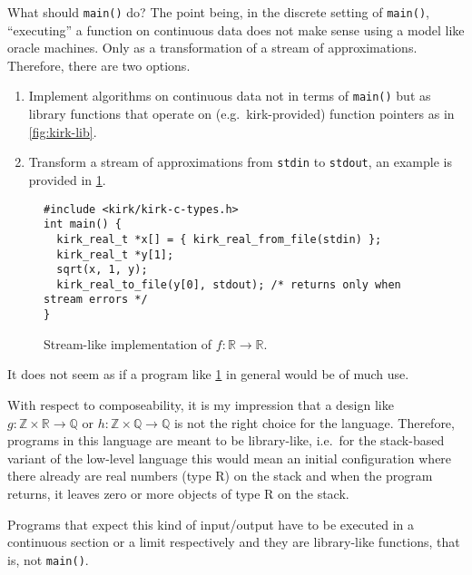 \documentclass[a4paper,parskip=half]{scrartcl}
\begin{document}
What should \verb!main()! do? The point being, in the discrete setting of
\verb!main()!, ``executing'' a function on continuous data does not make sense
using a model like oracle machines. Only as a transformation of a stream of
approximations. Therefore, there are two options.
\begin{enumerate}
\item
	Implement algorithms on continuous data not in terms of \verb!main()!
	but as library functions that operate on (e.g.\ kirk-provided) function
	pointers as in \cref{fig:kirk-lib}.
\item
	Transform a stream of approximations from \verb!stdin! to \verb!stdout!,
	an example is provided in \cref{fig:stream}.
\end{enumerate}

\begin{figure}[H]
\begin{verbatim}
#include <kirk/kirk-c-types.h>
int main() {
  kirk_real_t *x[] = { kirk_real_from_file(stdin) };
  kirk_real_t *y[1];
  sqrt(x, 1, y);
  kirk_real_to_file(y[0], stdout); /* returns only when stream errors */
}
\end{verbatim}
\caption{Stream-like implementation of $f:\mathbb R\to\mathbb R$.}
\label{fig:stream}
\end{figure}

It does not seem as if a program like \cref{fig:stream} in general would be of
much use.

With respect to composeability, it is my impression that a design like
$g:\mathbb Z\times\mathbb R\to\mathbb Q$ or
$h:\mathbb Z\times\mathbb Q\to\mathbb Q$ is not the right choice for the
language. Therefore, programs in this language are meant to be library-like,
i.e.\ for the stack-based variant of the low-level language this would mean
an initial configuration where there already are real numbers (type R) on the
stack and when the program returns, it leaves zero or more objects of type R on
the stack.

Programs that expect this kind of input/output have to be executed in a
continuous section or a limit respectively and they are library-like functions,
that is, not \verb!main()!.
\end{document}
